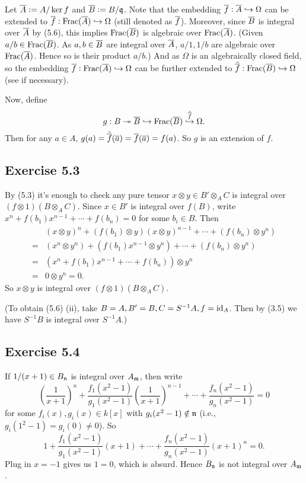 \documentclass[../A&M.tex]{subfiles}
\begin{document}
Let $\overline{A}:=A/\ker f$ and $\overline{B}:=B/\mathfrak{q}$. Note that the embedding $\overline{f}: \overline{A} \hookrightarrow \Omega$ can be extended to $\overline{f}: \operatorname{Frac}(\overline{A}) \hookrightarrow \Omega$ (still denoted as $\overline{f}$). Moreover, since $\overline{B}$ is integral over $\overline{A}$ by (5.6), this implies $\operatorname{Frac}(\overline{B})$ is algebraic over $\operatorname{Frac}(\overline{A})$. (Given $a/b \in \operatorname{Frac}(\overline{B})$. As $a,b\in\overline{B}$ are integral over $\overline{A}$, $a/1,1/b$ are algebraic over $\operatorname{Frac}(\overline{A})$. Hence so is their product $a/b$.) And as $\Omega$ is an algebraically closed field, so the embedding $\overline{f}: \operatorname{Frac}(\overline{A}) \hookrightarrow \Omega$ can be further extended to $\tilde{\overline{f}}: \operatorname{Frac}(\overline{B}) \hookrightarrow \Omega$ (see  if necessary).

Now, define
$$
g: B \twoheadrightarrow \overline{B} \hookrightarrow \operatorname{Frac}(\overline{B}) \overset{\tilde{\overline{f}}}{\hookrightarrow} \Omega.
$$
Then for any $a\in A$, $g(a) = \tilde{\overline{f}}(\overline{a}) = \overline{f}(\overline{a}) = f(a)$. So $g$ is an extension of $f$.

\subsection*{Exercise 5.3}

By (5.3) it's enough to check any pure tensor $x \otimes y \in B' \otimes_A C$ is integral over $(f \otimes 1)(B \otimes_A C)$. Since $x \in B'$ is integral over $f(B)$, write $x^n + f(b_1)x^{n-1} + \cdots + f(b_n) = 0$ for some $b_i \in B$. Then
\begin{align*}
&(x \otimes y)^n + (f(b_1) \otimes y)(x \otimes y)^{n-1} + \cdots + (f(b_n) \otimes y^n)    \\
={} &(x^n \otimes y^n) + (f(b_1)x^{n-1} \otimes y^n) + \cdots + (f(b_n) \otimes y^n)  \\
={} &(x^n + f(b_1)x^{n-1} + \cdots + f(b_n)) \otimes y^n   \\
={} &0 \otimes y^n = 0.
\end{align*}
So $x \otimes y$ is integral over $(f \otimes 1)(B \otimes_A C)$.

(To obtain (5.6) (ii), take $B=A, B'=B, C=S^{-1}A, f=\operatorname{id}_A$. Then by (3.5) we have $S^{-1}B$ is integral over $S^{-1}A$.)

\subsection*{Exercise 5.4}

If $1/(x+1) \in B_{\mathfrak{n}}$ is integral over $A_{\mathfrak{m}}$, then write
$$
\left( \frac{1}{x+1} \right)^n + \frac{f_1(x^2-1)}{g_1(x^2-1)} \left( \frac{1}{x+1} \right)^{n-1} + \cdots + \frac{f_n(x^2-1)}{g_n(x^2-1)} = 0
$$
for some $f_i(x),g_i(x) \in k[x]$ with $g_i(x^2-1) \notin \mathfrak{n}$ (i.e., $g_i(1^2-1) = g_i(0) \neq 0$). So
$$
1 + \frac{f_1(x^2-1)}{g_1(x^2-1)} (x+1) + \cdots + \frac{f_n(x^2-1)}{g_n(x^2-1)} (x+1)^n = 0.
$$
Plug in $x=-1$ gives us $1=0$, which is absurd. Hence $B_{\mathfrak{n}}$ is not integral over $A_{\mathfrak{m}}$.
\end{document}

